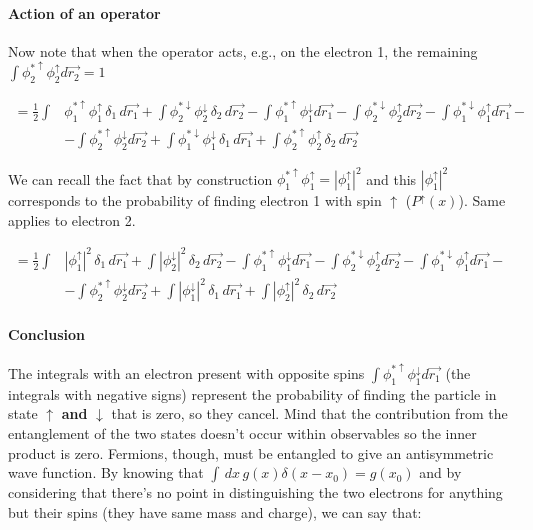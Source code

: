 			\paragraph{Action of an operator}
			Now note that when the operator acts, e.g., on the electron 1, the remaining $\int \phi_2^{*\uparrow}\phi_2^\uparrow d\vec{r_2}=1$

			\begin{align*}
				=\frac{1}{2}\int&\phi_1^{*\uparrow}\phi_1^\uparrow \,\delta_1\, d\vec{r_1}+\int \phi_2^{*\downarrow}\phi_2^\downarrow\, \delta_2\, d\vec{r_2}-\int \phi_1^{*\uparrow}\phi_1^\downarrow d\vec{r_1}-\int \phi_2^{*\downarrow}\phi_2^\uparrow d\vec{r_2}-\int \phi_1^{*\downarrow}\phi_1^\uparrow d\vec{r_1}-\\
												&-\int \phi_2^{*\uparrow}\phi_2^\downarrow d\vec{r_2}+\int \phi_1^{*\downarrow}\phi_1^\downarrow\, \delta_1\, d\vec{r_1}+\int \phi_2^{*\uparrow}\phi_2^\uparrow\, \delta_2\, d\vec{r_2}
			\end{align*}

			We can recall the fact that by construction $\phi_1^{*\uparrow}\phi_1^\uparrow=|\phi_1^\uparrow|^2$  and this $|\phi_1^\uparrow|^2$ corresponds to the probability of finding electron 1 with spin $\uparrow$ ($P^\uparrow(x)$).
			Same applies to electron 2.

			\begin{align*}
				=\frac{1}{2}\int&|\phi_1^\uparrow|^2 \,\delta_1\, d\vec{r_1}+\int |\phi_2^\downarrow|^2\, \delta_2\, d\vec{r_2}-\int \phi_1^{*\uparrow}\phi_1^\downarrow d\vec{r_1}-\int \phi_2^{*\downarrow}\phi_2^\uparrow d\vec{r_2}-\int \phi_1^{*\downarrow}\phi_1^\uparrow d\vec{r_1}-\\
												&-\int \phi_2^{*\uparrow}\phi_2^\downarrow d\vec{r_2}+\int |\phi_1^\downarrow|^2\, \delta_1\, d\vec{r_1}+\int |\phi_2^\uparrow|^2\, \delta_2\, d\vec{r_2}
			\end{align*}

			\paragraph{Conclusion}
			The integrals with an electron present with opposite spins $\int \phi_1^{*\uparrow}\phi_1^\downarrow d\vec{r_1}$ (the integrals with negative signs) represent the probability of finding the particle in state $\uparrow$ \textbf{and} $\downarrow$ that is zero, so they cancel.
			Mind that the contribution from the entanglement of the two states doesn't occur within observables so the inner product is zero.
			Fermions, though, must be entangled to give an antisymmetric wave function.
			By knowing that $\int\,dx\, g(x)\delta(x-x_0)=g(x_0)$ and by considering that there's no point in distinguishing the two electrons for anything but their spins (they have same mass and charge), we can say that:

